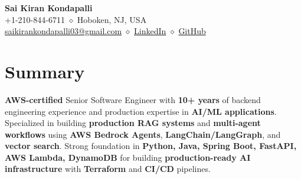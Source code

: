 \documentclass[11pt,a4paper]{article}
\newcommand{\resumeHeader}[4]{
    \begin{center}
        {\Huge\bfseries #1}\\[0.3cm]
        #2 \quad $\diamond$ \quad #3\\[0.15cm]
        #4
    \end{center}
}
\begin{document}

\resumeHeader{Sai Kiran Kondapalli}
{+1-210-844-6711}
{Hoboken, NJ, USA}
{\href{mailto:saikirankondapalli03@gmail.com}{saikirankondapalli03@gmail.com} \quad $\diamond$ \quad \href{https://www.linkedin.com/in/saikirankondapalli}{LinkedIn} \quad $\diamond$ \quad \href{https://github.com/saikirankondapalli}{GitHub}}

\section{Summary}
\small\raggedright{\textbf{AWS-certified} Senior Software Engineer with \textbf{10+ years} of backend engineering experience and production expertise in \textbf{AI/ML applications}. Specialized in building \textbf{production RAG systems} and \textbf{multi-agent workflows} using \textbf{AWS Bedrock Agents}, \textbf{LangChain/LangGraph}, and \textbf{vector search}. Strong foundation in \textbf{Python, Java, Spring Boot, FastAPI, AWS Lambda, DynamoDB} for building \textbf{production-ready AI infrastructure} with \textbf{Terraform} and \textbf{CI/CD} pipelines.}

\end{document}
